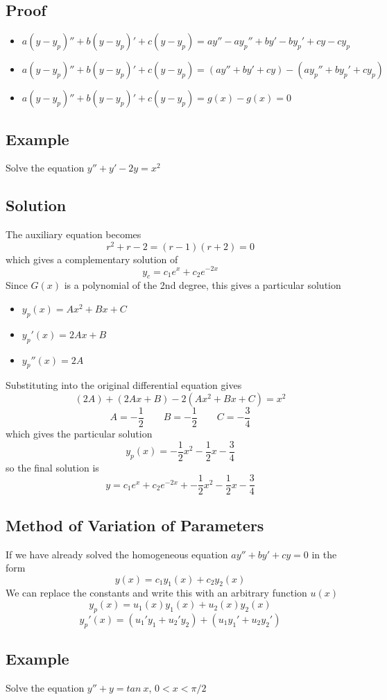 \subsection*{Proof}
\begin{itemize}
    \item[] $a(y - y_p)'' + b(y - y_p)' + c(y - y_p) = ay'' - ay_p'' + by' - by_p' + cy - cy_p$
    \item[] $a(y - y_p)'' + b(y - y_p)' + c(y - y_p) = (ay'' + by' + cy) - (ay_p'' + by_p' + cy_p)$
    \item[] $a(y - y_p)'' + b(y - y_p)' + c(y - y_p) = g(x) - g(x) = 0$
\end{itemize}

\subsection*{Example}
Solve the equation $y''+y'-2y=x^2$

\subsection*{Solution}
The auxiliary equation becomes
$$r^2+r-2=(r-1)(r+2)=0$$
which gives a complementary solution of
$$y_c=c_1e^x+c_2e^{-2x}$$
Since $G(x)$ is a polynomial of the 2nd degree, this gives a particular solution
\begin{itemize}
    \item[] $y_p(x)=Ax^2+Bx+C$
    \item[] $y_p'(x)=2Ax+B$
    \item[] $y_p''(x)=2A$
\end{itemize}
Substituting into the original differential equation gives
$$(2A) + (2Ax + B) - 2(Ax^2 + Bx + C) = x^2$$
$$A=-\frac{1}{2} \qquad B=-\frac{1}{2} \qquad C=-\frac{3}{4}$$
which gives the particular solution
$$y_p(x)=-\frac{1}{2}x^2-\frac{1}{2}x-\frac{3}{4}$$
so the final solution is
$$y = c_1e^x + c_2e^{-2x} +  -\frac{1}{2} x^2 - \frac{1}{2} x - \frac{3}{4}$$

\subsection*{Method of Variation of Parameters}
If we have already solved the homogeneous equation $ay''+by'+cy=0$ in the form
$$y(x)=c_1y_1(x)+c_2y_2(x)$$
We can replace the constants and write this with an arbitrary function $u(x)$
$$y_p(x)=u_1(x)y_1(x)+u_2(x)y_2(x)$$
$$y_p'(x)=(u_1'y_1+u_2'y_2)+(u_1y_1'+u_2y_2')$$

\subsection*{Example}
Solve the equation $y''+y=tan\:x$, $0<x<\pi/2$

